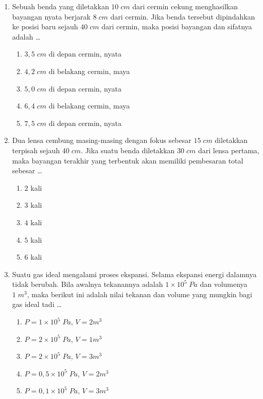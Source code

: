 \documentclass[A4,12PT, english, twocolumn]{journal}
\begin{document}
\begin{enumerate}
\item Sebuah benda yang diletakkan $10 \; cm$ dari cermin cekung menghasilkan bayangan nyata berjarak $8 \; cm $ dari cermin. Jika benda tersebut dipindahkan ke posisi baru sejauh $40 \; cm$ dari cermin, maka posisi bayangan dan sifatnya adalah \dots 
    \begin{enumerate}
        \item $3,5 \; cm$ di depan cermin, nyata
        \item $4,2 \; cm$ di belakang cermin, maya
        \item $5,0 \; cm$ di depan cermin, nyata
        \item $6,4 \; cm$ di belakang cermin, maya
        \item $7,5 \; cm$ di depan cermin, nyata
    \end{enumerate}
  
\item Dua lensa cembung masing-masing dengan fokus sebesar $15 \; cm$ diletakkan terpisah sejauh $40 \; cm$. Jika suatu benda diletakkan $30 \; cm$ dari lensa pertama, maka bayangan terakhir yang terbentuk akan memiliki pembesaran total sebesar \dots
    \begin{enumerate}
        \item $2$ kali
        \item $3$ kali
        \item $4$ kali
        \item $5$ kali
        \item $6$ kali
    \end{enumerate}
    
\item Suatu gas ideal mengalami proses ekspansi. Selama ekspansi energi dalamnya tidak berubah. Bila awalnya tekanannya adalah $1 \times 10^5 \; Pa$ dan volumenya $1 \; m^3$, maka berikut ini adalah nilai tekanan dan volume yang mungkin bagi gas ideal tadi \dots
    \begin{enumerate}
        \item $P=1 \times 10^5 \; Pa$, $V=2m^3$
        \item $P=2 \times 10^5 \; Pa$, $V=1m^3$
        \item $P=2 \times 10^5 \; Pa$, $V=3m^3$
        \item $P=0,5 \times 10^5 \; Pa$, $V=2m^3$
        \item $P=0,1 \times 10^5 \; Pa$, $V=3m^3$
    \end{enumerate}


\end{enumerate}
\end{document}
